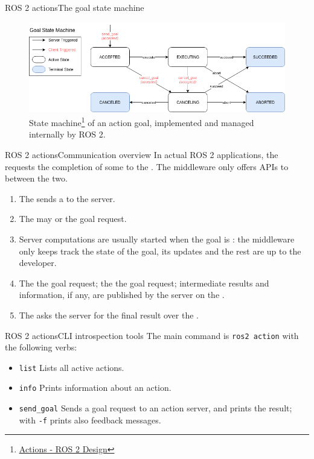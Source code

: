 \begin{frame}{ROS 2 actions}{The goal state machine}
  \begin{figure}
    \centering
    \includegraphics[width=\textwidth]{goalStateMachine.png}
    \caption{State machine\footnote{\href{http://design.ros2.org/articles/actions.html}{\color{blue}\underline{Actions - ROS 2 Design}}} of an action goal, implemented and managed internally by ROS 2.}
    \label{fig:goalStateMachine}
  \end{figure}
\end{frame}
\begin{frame}{ROS 2 actions}{Communication overview}
  In actual ROS 2 applications, the  requests the completion of some  to the . The middleware only offers APIs to  between the two.
  \begin{enumerate}
    \item The  sends a  to the server.
    \item The  may  or  the goal request.
    \item Server computations are usually started when the goal is : the middleware only keeps track the state of the goal, its updates and the rest are up to the developer.
    \item The  the goal request; the  the goal request; intermediate results and information, if any, are published by the server on the .
    \item The  asks the server for the final result over the .
  \end{enumerate}
\end{frame}
\begin{frame}{ROS 2 actions}{CLI introspection tools}
  The main command is \texttt{ros2 action} with the following verbs:
  \begin{itemize}
    \item \texttt{list} Lists all active actions.
    \item \texttt{info} Prints information about an action.
    \item \texttt{send\_goal} Sends a goal request to an action server, and prints the result; with \texttt{-f} prints also feedback messages.
  \end{itemize}
\end{frame}
